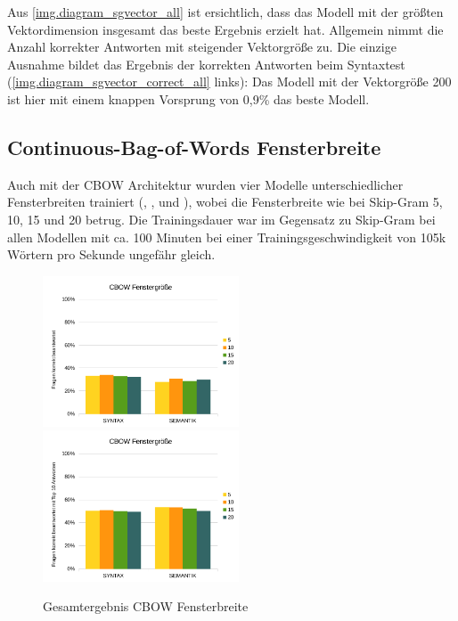 Aus \autoref{img.diagram_sgvector_all} ist ersichtlich, dass das Modell  mit der größten Vektordimension insgesamt das beste Ergebnis erzielt hat. Allgemein nimmt die Anzahl korrekter Antworten mit steigender Vektorgröße zu. Die einzige Ausnahme bildet das Ergebnis der korrekten Antworten beim Syntaxtest (\autoref{img.diagram_sgvector_correct_all} links): Das Modell mit der Vektorgröße 200 ist hier mit einem knappen Vorsprung von 0,9\% das beste Modell.

\subsection{Continuous-Bag-of-Words Fensterbreite}
Auch mit der CBOW Architektur wurden vier Modelle unterschiedlicher Fensterbreiten trainiert (, ,  und ), wobei die Fensterbreite wie bei Skip-Gram 5, 10, 15 und 20 betrug. Die Trainingsdauer war im Gegensatz zu Skip-Gram bei allen Modellen mit ca. 100 Minuten bei einer Trainingsgeschwindigkeit von 105k Wörtern pro Sekunde ungefähr gleich.

\begin{figure}[!ht]
\begin{adjustwidth}{-4mm}{-4mm}
\centering
{}
{\includegraphics[width=0.52\textwidth]{images/diagram_cbwindow_correct_all}}
{\includegraphics[width=0.52\textwidth]{images/diagram_cbwindow_top10_all}}
\caption[Gesamtergebnis CBOW Fensterbreite]{Gesamtergebnis CBOW Fensterbreite}\label{img.diagram_cbwindow_all}
\end{adjustwidth}
\end{figure}

